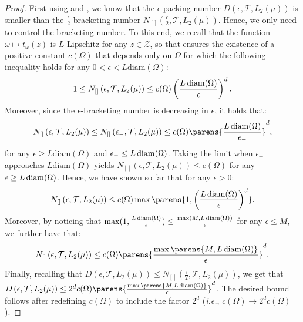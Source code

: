 \begin{proof}
	First using \citep[Lemma~9.18]{Kosorok2008} and \citep[Paragraph~8.1.2]{Kosorok2008}, we know that the $\epsilon$-packing number $D\left(\epsilon,\mathcal{T},L_2(\mu)\right)$ is  smaller than the $\frac{\epsilon}{2}$-bracketing number $N_{[]}\left(\frac{\epsilon}{2},\mathcal{T},L_2(\mu)\right)$. Hence, we only need to control the bracketing number. To this end, we recall that the function $\omega\mapsto t_{\omega}(z)$ is $L$-Lipschitz for any $z\in \mathcal{Z}$, so that  \citep[Example~19.7]{van2000asymptotic} ensures the existence of a positive constant $c(\Omega)$ that depends only on $\Omega$ for which the following inequality holds for any $0<\epsilon< L\text{diam}(\Omega)$:
\begin{equation*}
    1\leq N_{[]}\left(\epsilon,\mathcal{T},L_2(\mu)\right)\leq c(\Omega)\left(\frac{L\operatorname{diam}(\Omega)}{\epsilon}\right)^d.
\end{equation*}
Moreover, since the $\epsilon$-bracketing number is decreasing in $\epsilon$, it holds that:
$$N_{[]}\left(\epsilon,\mathcal{T},L_2(\mu)\right)\leq N_{[]}\left(\epsilon_{-},\mathcal{T},L_2(\mu)\right) \leq c(\Omega)\parens{\frac{L\diam(\Omega)}{\epsilon_{-}}}^{d},$$ 
for any $\epsilon\geq L\text{diam}(\Omega)$ and $\epsilon_{-}\leq L\operatorname{diam}(\Omega)$. Taking the limit when $\epsilon_{-}$ approaches $L\text{diam}(\Omega)$ yields $N_{[]}\left(\epsilon,\mathcal{T},L_2(\mu)\right)\leq c(\Omega)$ for any $\epsilon\geq L\operatorname{diam}(\Omega)$. Hence, we have shown so far that for any $\epsilon>0$:
\begin{align*}
	N_{[]}\left(\epsilon,\mathcal{T},L_2(\mu)\right)\leq c(\Omega)\max\parens{1,\left(\frac{L\diam(\Omega)}{\epsilon}\right)^d}.
\end{align*}
Moreover, by noticing that $\max(1,\frac{L\operatorname{diam}(\Omega)}{\epsilon})\leq \frac{\max(M,L\operatorname{diam}(\Omega))}{\epsilon}$ for any $\epsilon\leq M$, we further have that:
\begin{align*}
	N_{[]}\left(\epsilon,\mathcal{T},L_2(\mu)\right)\leq  c(\Omega)\parens{\frac{\max\parens{M,L\diam(\Omega)}}{\epsilon}}^d.
\end{align*}
Finally, recalling that $ D\left(\epsilon,\mathcal{T},L_2(\mu)\right)\leq  N_{[]}\left(\frac{\epsilon}{2},\mathcal{T},L_2(\mu)\right)$, we get that $D\left(\epsilon,\mathcal{T},L_2(\mu)\right)\leq  2^dc(\Omega)\parens{\frac{\max\parens{M,L\diam(\Omega)}}{\epsilon}}^d$. 
The desired bound follows after redefining $c(\Omega)$ to include the factor $2^d$ (\textit{i.e.}, $c(\Omega)\rightarrow 2^dc(\Omega)$).
\end{proof}

